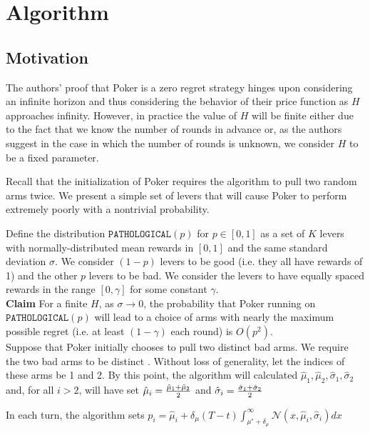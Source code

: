 \documentclass[12pt]{article}
\begin{document}
\section{Algorithm}

\subsection{Motivation}

The authors' proof that Poker is a zero regret strategy hinges upon considering an infinite horizon and thus considering the behavior of their price function as $H$ approaches infinity. However, in practice the value of $H$ will be finite either due to the fact that we know the number of rounds in advance or, as the authors suggest in the case in which the number of rounds is unknown, we consider $H$ to be a fixed parameter.

Recall that the initialization of Poker requires the algorithm to pull two random arms twice. We present a simple set of levers that will cause Poker to perform extremely poorly with a nontrivial probability.

Define the distribution $\texttt{PATHOLOGICAL}(p)$ for $p \in [0,1]$ as a set of $K$ levers with normally-distributed mean rewards in $[0,1]$ and the same standard deviation $\sigma$. We consider $(1-p)$ levers to be good (i.e. they all have rewards of 1) and the other $p$ levers to be bad. We consider the levers to have equally spaced rewards in the range $[0,\gamma]$ for some constant $\gamma$. \\

\noindent
\textbf{Claim} For a finite $H$, as $\sigma \rightarrow 0$, the probability that Poker running on $\texttt{PATHOLOGICAL}(p)$ will lead to a choice of arms with nearly the maximum possible regret (i.e. at least $(1-\gamma)$ each round) is $O(p^{2})$. \\ 

Suppose that Poker initially chooses to pull two distinct bad arms. We require the two bad arms to be distinct . Without loss of generality, let the indices of these arms be 1 and 2. By this point, the algorithm will calculated $\hat{\mu}_{1}, \hat{\mu}_{2}, \hat{\sigma}_{1},\hat{\sigma}_{2}$ and, for all $i > 2$, will have set $\hat{\mu}_{i}= {\hat{\mu}_{1}+\hat{\mu}_{2}\over 2}$ and $\hat{\sigma}_{i} = {\hat{\sigma}_{1}+\hat{\sigma}_{2}\over 2}$

In each turn, the algorithm sets $p_{i} = \hat{\mu}_{i} + \delta_{\mu}(T-t)\int_{\mu^{*}+\delta_{\mu}}^{\infty}\mathcal{N}(x,\hat{\mu}_{i}, \hat{\sigma}_{i})dx$
\end{document}
